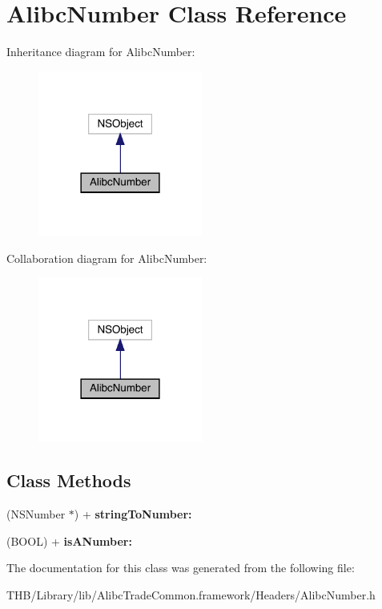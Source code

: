 \hypertarget{interface_alibc_number}{}\section{Alibc\+Number Class Reference}
\label{interface_alibc_number}


Inheritance diagram for Alibc\+Number\+:\nopagebreak
\begin{figure}[H]
\begin{center}
\leavevmode
\includegraphics[width=153pt]{interface_alibc_number__inherit__graph}
\end{center}
\end{figure}


Collaboration diagram for Alibc\+Number\+:\nopagebreak
\begin{figure}[H]
\begin{center}
\leavevmode
\includegraphics[width=153pt]{interface_alibc_number__coll__graph}
\end{center}
\end{figure}
\subsection*{Class Methods}
\begin{DoxyCompactItemize}
\item 
\mbox{\label{interface_alibc_number_a427496af4cb265fe95d5f9477191a564}} 
(N\+S\+Number $\ast$) + {\bfseries string\+To\+Number\+:}
\item 
\mbox{\label{interface_alibc_number_ae148e2840d948122f06e7b7842b62654}} 
(B\+O\+OL) + {\bfseries is\+A\+Number\+:}
\end{DoxyCompactItemize}


The documentation for this class was generated from the following file\+:\begin{DoxyCompactItemize}
\item 
T\+H\+B/\+Library/lib/\+Alibc\+Trade\+Common.\+framework/\+Headers/Alibc\+Number.\+h\end{DoxyCompactItemize}

